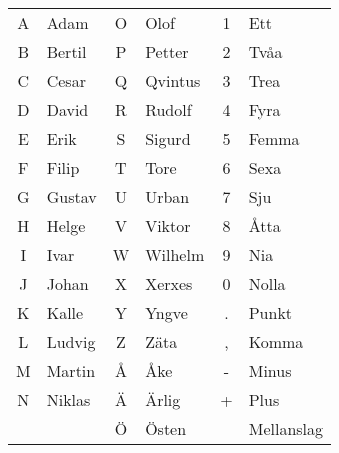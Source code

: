 \begin{center}
\begin{tabular}{cl|cl|cl }
	A & Adam   & O & Olof    & 1 & Ett        \\
	B & Bertil & P & Petter  & 2 & Tvåa       \\
	C & Cesar  & Q & Qvintus & 3 & Trea       \\
	D & David  & R & Rudolf  & 4 & Fyra       \\
	E & Erik   & S & Sigurd  & 5 & Femma      \\
	F & Filip  & T & Tore    & 6 & Sexa       \\
	G & Gustav & U & Urban   & 7 & Sju        \\
	H & Helge  & V & Viktor  & 8 & Åtta       \\
	I & Ivar   & W & Wilhelm & 9 & Nia        \\
	J & Johan  & X & Xerxes  & 0 & Nolla      \\
	K & Kalle  & Y & Yngve   & . & Punkt      \\
	L & Ludvig & Z & Zäta    & , & Komma      \\
	M & Martin & Å & Åke     & - & Minus      \\
	N & Niklas & Ä & Ärlig   & + & Plus       \\
	  &        & Ö & Östen   &   & Mellanslag \\
\end{tabular}
\end{center}


